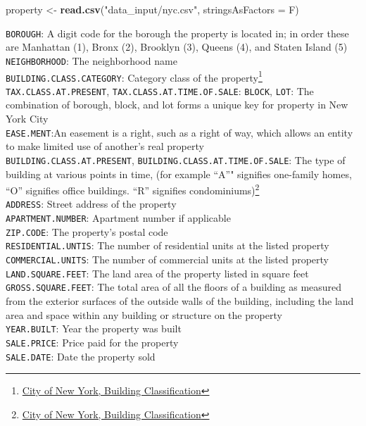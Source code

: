 \documentclass[]{article}
\newenvironment{Shaded}{\begin{snugshade}}{\end{snugshade}}
\newcommand{\DataTypeTok}[1]{\textcolor[rgb]{0.13,0.29,0.53}{#1}}
\newcommand{\KeywordTok}[1]{\textcolor[rgb]{0.13,0.29,0.53}{\textbf{#1}}}
\newcommand{\NormalTok}[1]{#1}
\newcommand{\StringTok}[1]{\textcolor[rgb]{0.31,0.60,0.02}{#1}}
\let\rmarkdownfootnote\footnote%
\def\footnote{\protect\rmarkdownfootnote}
\begin{document}
\begin{Shaded}
\begin{Highlighting}[]
\NormalTok{property <-}\StringTok{ }\KeywordTok{read.csv}\NormalTok{(}\StringTok{"data_input/nyc.csv"}\NormalTok{, }\DataTypeTok{stringsAsFactors =}\NormalTok{ F)}
\end{Highlighting}
\end{Shaded}

\texttt{BOROUGH}: A digit code for the borough the property is located
in; in order these are Manhattan (1), Bronx (2), Brooklyn (3), Queens
(4), and Staten Island (5)\\
\texttt{NEIGHBORHOOD}: The neighborhood name\\
\texttt{BUILDING.CLASS.CATEGORY}: Category class of the
property\footnote{\href{http://www1.nyc.gov/assets/finance/jump/hlpbldgcode.html}{City
  of New York, Building Classification}}\\
\texttt{TAX.CLASS.AT.PRESENT}, \texttt{TAX.CLASS.AT.TIME.OF.SALE}:
\texttt{BLOCK}, \texttt{LOT}: The combination of borough, block, and lot
forms a unique key for property in New York City\\
\texttt{EASE.MENT}:An easement is a right, such as a right of way, which
allows an entity to make limited use of another's real property\\
\texttt{BUILDING.CLASS.AT.PRESENT},
\texttt{BUILDING.CLASS.AT.TIME.OF.SALE}: The type of building at various
points in time, (for example ``A''" signifies one-family homes, ``O''
signifies office buildings. ``R'' signifies condominiums)\footnote{\href{http://www1.nyc.gov/assets/finance/jump/hlpbldgcode.html}{City
  of New York, Building Classification}}\\
\texttt{ADDRESS}: Street address of the property\\
\texttt{APARTMENT.NUMBER}: Apartment number if applicable\\
\texttt{ZIP.CODE}: The property's postal code\\
\texttt{RESIDENTIAL.UNTIS}: The number of residential units at the
listed property\\
\texttt{COMMERCIAL.UNITS}: The number of commercial units at the listed
property\\
\texttt{LAND.SQUARE.FEET}: The land area of the property listed in
square feet\\
\texttt{GROSS.SQUARE.FEET}: The total area of all the floors of a
building as measured from the exterior surfaces of the outside walls of
the building, including the land area and space within any building or
structure on the property\\
\texttt{YEAR.BUILT}: Year the property was built\\
\texttt{SALE.PRICE}: Price paid for the property\\
\texttt{SALE.DATE}: Date the property sold
\end{document}
